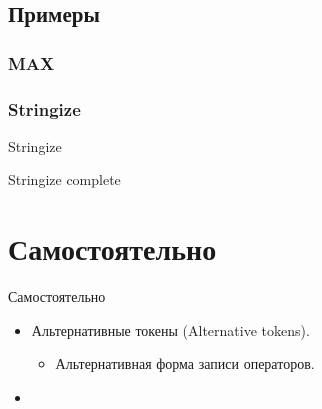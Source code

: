     \subsection{Примеры}
    \subsubsection{MAX}
    \begin{frame}
        
    \end{frame}
    \begin{frame}
        
    \end{frame}
    \begin{frame}
        
    \end{frame}
    \begin{frame}
        
    \end{frame}
    \begin{frame}
        
    \end{frame}
    \subsubsection{Stringize}
    \begin{frame}{Stringize}
        
    \end{frame}
    \begin{frame}{Stringize complete}
        
    \end{frame}

    \section{Самостоятельно}
    \begin{frame}{Самостоятельно}
        \begin{itemize}
            \item Альтернативные токены (Alternative tokens).
                \begin{itemize}
                    \item Альтернативная форма записи операторов.
                \end{itemize}
            \item
        \end{itemize}
    \end{frame}

